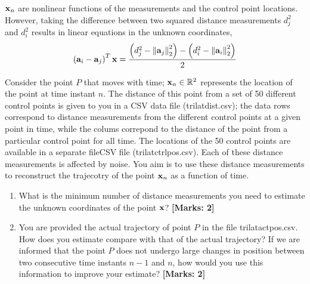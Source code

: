 \documentclass[12pt]{article}
\def\mf{\ensuremath\mathbf}
\def\mb{\ensuremath\mathbb}
\def\lp{\ensuremath\left(}
\def\rp{\ensuremath\right)}
\def\lV{\ensuremath\left\lVert}
\def\rV{\ensuremath\right\rVert}
\begin{document}
\begin{enumerate}
\begin{center}
    \end{center}

    $\mf{x}_n$ are nonlinear functions of the measurements and the control point locations. However, taking the difference between two squared distance measurements $d_j^2$ and $d_i^2$ results in linear equations in the unknown coordinates,
    \[ \lp \mf{a}_i - \mf{a}_j\rp^T\mf{x} = \frac{\lp d_j^2 - \lV\mf{a}_j\rV_2^2 \rp - \lp d_i^2  - \lV\mf{a}_i\rV_2^2 \rp}{2} \]

    Consider the point $P$ that moves with time; $\mf{x}_n \in \mb{R}^{2}$ represents the location of the point at time instant $n$. The distance of this point from a set of 50 different control points is given to you in a CSV data file (trilatdist.csv); the data rows correspond to distance measurements from the different control points at a given point in time, while the colums correpond to the distance of the point from a particular control point for all time. The locations of the 50 control points are available in a separate fileCSV file (trilatctrlpos.csv). Each of these distance measurements is affected by noise. You aim is to use these distance measurements to reconstruct the trajecotry of the point $\mf{x}_n$ as a function of time.
    \begin{enumerate}
        \item What is the minimum number of distance measurements you need to estimate the unknown coordinates of the point $\mf{x}$? \textbf{[Marks: 2]}
        \item You are provided the actual trajectory of point $P$ in the file trilatactpos.csv. How does you estimate compare with that of the actual trajectory? If we are informed that the point $P$ does not undergo large changes in position between two consecutive time instants $n-1$ and $n$, how would you use this information to improve your estimate? \textbf{[Marks: 2]}
    \end{enumerate}
\end{enumerate}
\end{document}
